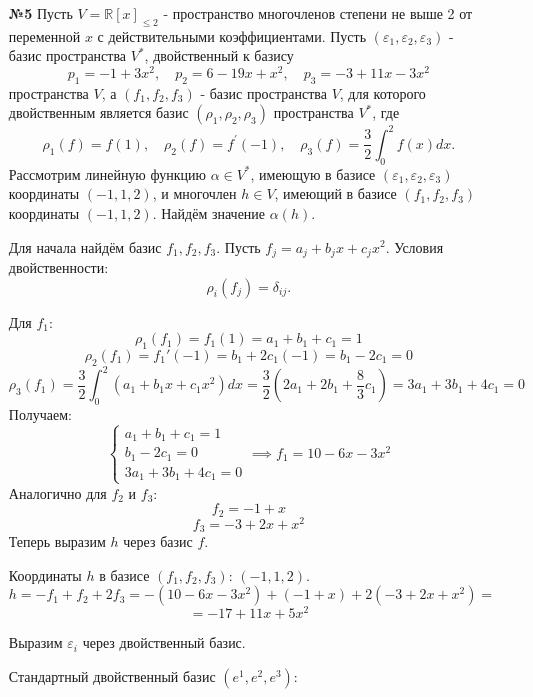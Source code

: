 \documentclass[a4paper]{article}
\begin{document}
\begin{enumerate}
    \item[\textbf{№5}]Пусть $ V = \mathbb{R}[x]_{\leqslant 2} $
     - пространство многочленов степени не выше 2 от переменной $ x $ 
     с действительными коэффициентами. 
     Пусть $ \left(\varepsilon_{1}, \varepsilon_{2}, \varepsilon_{3}\right) $ 
     - базис пространства $ V^{*} $, двойственный к базису
    $$
    p_1 = -1 + 3 x^{2}, \quad p_2 = 6 - 19 x + x^{2}, \quad p_3 = -3 + 11 x - 3 x^{2}
    $$
    пространства $ V $, а $ \left(f_{1}, f_{2}, f_{3}\right) $
    - базис пространства $ V $, для которого двойственным является базис 
    $ \left(\rho_{1}, \rho_{2}, \rho_{3}\right) $ пространства $ V^{*} $, где
    $$
    \rho_{1}(f) = f(1), \quad \rho_{2}(f) = f^{\prime}(-1), \quad \rho_{3}(f) = 
    \frac{3}{2} \int_{0}^{2} f(x) d x.
    $$
    Рассмотрим линейную функцию $ \alpha \in V^{*} $, имеющую в базисе 
    $ \left(\varepsilon_{1}, \varepsilon_{2}, \varepsilon_{3}\right) $ 
    координаты $ (-1, 1, 2) $, и многочлен $ h \in V $, имеющий в базисе 
    $ \left(f_{1}, f_{2}, f_{3}\right) $ координаты $ (-1, 1, 2) $.
    Найдём значение $ \alpha(h) $.

    Для начала найдём базис $f_1, f_2, f_3$. 
    Пусть \( f_j = a_j + b_j x + c_j x^2 \). Условия двойственности:
    \[
    \rho_i(f_j) = \delta_{ij}.
    \]
    
    Для \( f_1 \):
    \[ \rho_1(f_1) = f_1(1) = a_1 + b_1 + c_1 = 1 \]
    \[ \rho_2(f_1) = f_1'(-1) = b_1 + 2c_1(-1) = b_1 - 2c_1 = 0 \]
    \[ \rho_3(f_1) = \frac{3}{2} \int_{0}^{2} (a_1 + b_1 x + c_1 x^2) 
    dx = \frac{3}{2} \left(2a_1 + 2b_1 + \frac{8}{3}c_1 \right) = 
    3a_1 + 3b_1 + 4c_1 = 0 \]
    Получаем:
    \[
    \begin{cases}
    a_1 + b_1 + c_1 = 1 \\
    b_1 - 2c_1 = 0 \\
    3a_1 + 3b_1 + 4c_1 = 0
    \end{cases}
    \implies f_1 = 10 - 6x - 3x^2 \]
    Аналогично для \( f_2 \) и \( f_3 \):
    \[ f_2 = -1 + x \]
    \[ f_3 = -3 + 2x + x^2 \]
    Теперь выразим \( h \) через базис $f$.

    Координаты \( h \) в базисе \( (f_1, f_2, f_3) \): \( (-1, 1, 2) \).
    \[
    h = -f_1 + f_2 + 2f_3 = - (10 - 6x - 3x^2) + (-1 + x) + 2(-3 + 2x + x^2)=
    \]\[= -17 + 11x + 5x^2
    \]

    Выразим \( \varepsilon_i \) через двойственный базис.

    Стандартный двойственный базис \( (e^1, e^2, e^3) \):


\end{enumerate}
\end{document}
